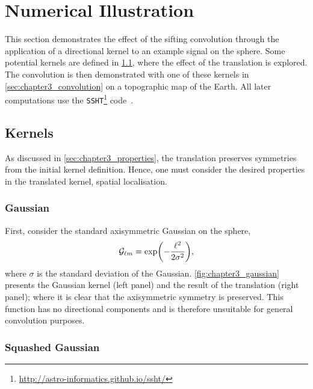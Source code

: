 \section{Numerical Illustration}\label{sec:chapter3_numerical_illustration}

This section demonstrates the effect of the sifting convolution through the application of a directional kernel to an example signal on the sphere.
Some potential kernels are defined in \cref{sec:chapter3_kernels}, where the effect of the translation is explored.
The convolution is then demonstrated with one of these kernels in \cref{sec:chapter3_convolution} on a topographic map of the Earth.
All later computations use the \texttt{SSHT}\footnote{\url{http://astro-informatics.github.io/ssht/}} code~\autocite{McEwen2011}.

\subsection{Kernels}\label{sec:chapter3_kernels}

As discussed in \cref{sec:chapter3_properties}, the translation preserves symmetries from the initial kernel definition.
Hence, one must consider the desired properties in the translated kernel, \eg{} spatial localisation.

\subsubsection{Gaussian}

First, consider the standard axisymmetric Gaussian on the sphere, \ie{}
%
\begin{equation}
	{\mathcal{G}}_{\ell m}
	= \exp(-\frac{{\ell}^{2}}{2\sigma^{2}}),
\end{equation}
%
where \(\sigma{}\) is the standard deviation of the Gaussian.
\cref{fig:chapter3_gaussian} presents the Gaussian kernel (left panel) and the result of the translation (right panel); where it is clear that the axisymmetric symmetry is preserved.
This function has no directional components and is therefore unsuitable for general convolution purposes.



\subsubsection{Squashed Gaussian}

